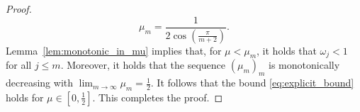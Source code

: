 \documentclass[10pt,a4paper]{amsart}
\def\Z{\mathbb{Z}}
\begin{document}
\begin{proof}
    \begin{equation}\label{eq:mum}
        \mu_m = \frac{1}{2 \cos\left(\frac{\pi}{m+2}\right)}.
    \end{equation}
    Lemma~\ref{lem:monotonic_in_mu} implies that, for $\mu < \mu_m$, it holds that $\omega_j < 1$ for all $j \leq m$. %
    Moreover, it holds that the sequence $(\mu_m)_m$ is monotonically decreasing with $\lim_{m \rightarrow \infty} \mu_m = \frac{1}{2}$. %
    It follows that the bound \eqref{eq:explicit_bound} holds for $\mu \in [0,\frac{1}{2}].$ This completes the proof.
\end{proof}
\end{document}
